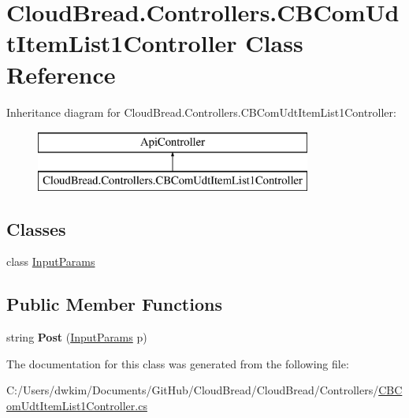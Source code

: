 \hypertarget{a00035}{}\section{Cloud\+Bread.\+Controllers.\+C\+B\+Com\+Udt\+Item\+List1\+Controller Class Reference}
\label{a00035}
Inheritance diagram for Cloud\+Bread.\+Controllers.\+C\+B\+Com\+Udt\+Item\+List1\+Controller\+:\begin{figure}[H]
\begin{center}
\leavevmode
\includegraphics[height=2.000000cm]{a00035}
\end{center}
\end{figure}
\subsection*{Classes}
\begin{DoxyCompactItemize}
\item 
class \hyperlink{a00094}{Input\+Params}
\end{DoxyCompactItemize}
\subsection*{Public Member Functions}
\begin{DoxyCompactItemize}
\item 
string {\bfseries Post} (\hyperlink{a00094}{Input\+Params} p)\hypertarget{a00035_a7acb4a9373b37377aff95ce255e6a694}{}\label{a00035_a7acb4a9373b37377aff95ce255e6a694}

\end{DoxyCompactItemize}


The documentation for this class was generated from the following file\+:\begin{DoxyCompactItemize}
\item 
C\+:/\+Users/dwkim/\+Documents/\+Git\+Hub/\+Cloud\+Bread/\+Cloud\+Bread/\+Controllers/\hyperlink{a00208}{C\+B\+Com\+Udt\+Item\+List1\+Controller.\+cs}\end{DoxyCompactItemize}
